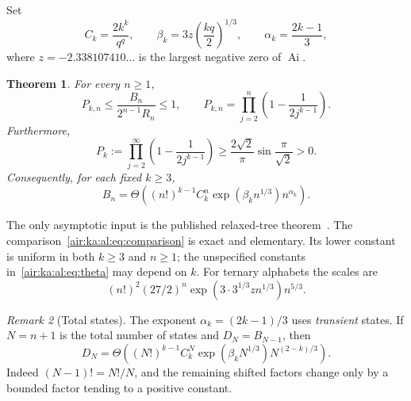 \documentclass[11pt,letterpaper]{article}
\numberwithin{equation}{section}
\newtheorem{theorem}{Theorem}[section]
\theoremstyle{remark}
\newtheorem{remark}[theorem]{Remark}
\newcommand{\Ai}{\operatorname{Ai}}
\begin{document}
Set
\begin{equation}\label{air:ka:al:eq:constants}
C_k=\frac{2k^k}{q^q},\qquad
\beta_k=3z\left(\frac{kq}{2}\right)^{1/3},\qquad
\alpha_k=\frac{2k-1}{3},
\end{equation}
where $z=-2.338107410\ldots$ is the largest negative zero of $\Ai$.
\begin{theorem}\label{air:ka:al:thm:main}
For every $n\ge1$,
\begin{equation}\label{air:ka:al:eq:comparison}
P_{k,n}\le\frac{B_n}{2^{n-1}R_n}\le1,\qquad
P_{k,n}=\prod_{j=2}^{n}\left(1-\frac1{2j^{k-1}}\right).
\end{equation}
Furthermore,
\begin{equation}\label{air:ka:al:eq:positive-product}
P_k:=\prod_{j=2}^{\infty}\left(1-\frac1{2j^{k-1}}\right)
\ge \frac{2\sqrt2}{\pi}\sin\frac{\pi}{\sqrt2}>0.
\end{equation}
Consequently, for each fixed $k\ge3$,
\begin{equation}\label{air:ka:al:eq:theta}
B_n=\Theta\!\left((n!)^{k-1}C_k^n
\exp(\beta_kn^{1/3})n^{\alpha_k}\right).
\end{equation}
\end{theorem}
The only asymptotic input is the published relaxed-tree theorem~\cite[Theorem~1]{gdw}.
The comparison~\eqref{air:ka:al:eq:comparison} is exact and elementary. Its lower
constant is uniform in both $k\ge3$ and $n\ge1$; the unspecified constants
in~\eqref{air:ka:al:eq:theta} may depend on $k$.
For ternary alphabets the scales are
\[
(n!)^2(27/2)^n\exp(3\cdot3^{1/3}zn^{1/3})n^{5/3}.
\]

\begin{remark}[Total states]
The exponent $\alpha_k=(2k-1)/3$ uses \emph{transient} states.
If $N=n+1$ is the total number of states and $D_N=B_{N-1}$, then
\[
D_N=\Theta\!\left((N!)^{k-1}C_k^N
\exp(\beta_kN^{1/3})N^{(2-k)/3}\right).
\]
Indeed $(N-1)!=N!/N$, and the remaining shifted factors change only by a
bounded factor tending to a positive constant.
\end{remark}
\end{document}
